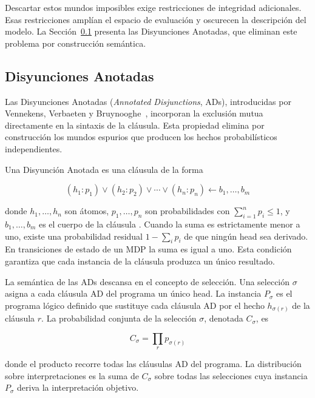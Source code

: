 Descartar estos mundos imposibles exige restricciones de integridad adicionales. Esas restricciones amplían el espacio de evaluación y oscurecen la descripción del modelo. La Sección~\ref{sec:mt-ads} presenta las Disyunciones Anotadas, que eliminan este problema por construcción semántica.

\subsection{Disyunciones Anotadas}
\label{sec:mt-ads}

Las Disyunciones Anotadas (\textit{Annotated Disjunctions}, ADs), introducidas por Vennekens, Verbaeten y Bruynooghe~\cite{vennekens2004lpads}, incorporan la exclusión mutua directamente en la sintaxis de la cláusula. Esta propiedad elimina por construcción los mundos espurios que producen los hechos probabilísticos independientes.

Una Disyunción Anotada es una cláusula de la forma

\begin{equation}
  (h_1 : p_1) \vee (h_2 : p_2) \vee \cdots \vee (h_n : p_n) \leftarrow b_1, \ldots, b_m
  \label{eq:ad-forma}
\end{equation}

donde $h_1, \ldots, h_n$ son átomos, $p_1, \ldots, p_n$ son probabilidades con $\sum_{i=1}^{n} p_i \leq 1$, y $b_1, \ldots, b_m$ es el cuerpo de la cláusula \cite{vennekens2004lpads}. Cuando la suma es estrictamente menor a uno, existe una probabilidad residual $1 - \sum_{i} p_i$ de que ningún head sea derivado. En transiciones de estado de un MDP la suma es igual a uno. Esta condición garantiza que cada instancia de la cláusula produzca un único resultado.

La semántica de las ADs descansa en el concepto de selección. Una selección $\sigma$ asigna a cada cláusula AD del programa un único head. La instancia $P_\sigma$ es el programa lógico definido que sustituye cada cláusula AD por el hecho $h_{\sigma(r)}$ de la cláusula $r$. La probabilidad conjunta de la selección $\sigma$, denotada $C_\sigma$, es \cite{vennekens2004lpads}

\begin{equation}
  C_\sigma = \prod_{r} p_{\sigma(r)}
  \label{eq:c-sigma}
\end{equation}

donde el producto recorre todas las cláusulas AD del programa. La distribución sobre interpretaciones es la suma de $C_\sigma$ sobre todas las selecciones cuya instancia $P_\sigma$ deriva la interpretación objetivo.


